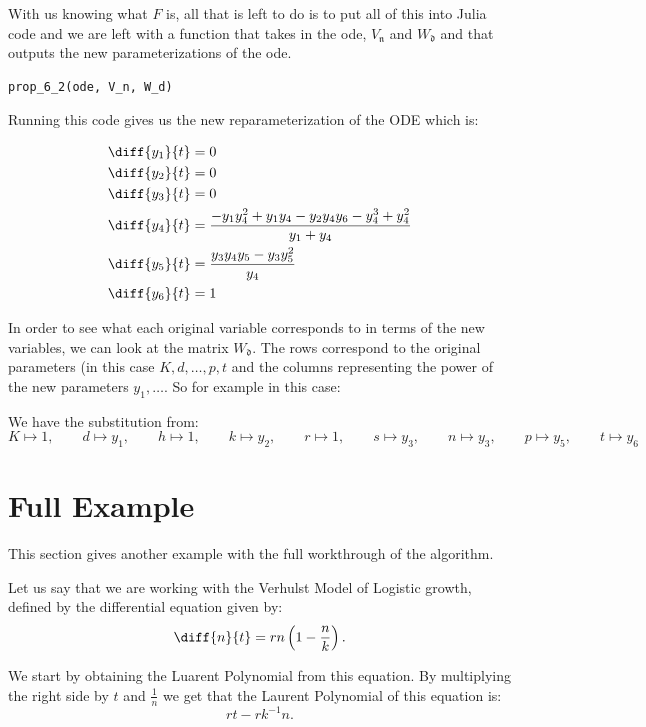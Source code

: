 \documentclass[oneside, a4paper, onecolumn, 11pt]{article}
\begin{document}
With us knowing what \(F\) is, all that is left to do is to put all of this into Julia code and we are left with a function that takes in the ode, \(V_{\mathfrak{n}}\) and \(W_{\mathfrak{d}}\) and that outputs the new parameterizations of the ode.
\begin{lstlisting}
prop_6_2(ode, V_n, W_d)
\end{lstlisting}

Running this code gives us the new reparameterization of the ODE which is:

\begin{align*}
    \diff{y_1}{t} & = 0                                                                    \\
    \diff{y_2}{t} & = 0                                                                    \\
    \diff{y_3}{t} & = 0                                                                    \\
    \diff{y_4}{t} & = \frac{-y_1 y_4^2 + y_1 y_4 - y_2 y_4 y_6 - y_4^3 + y_4^2}{y_1 + y_4} \\
    \diff{y_5}{t} & = \frac{y_3 y_4 y_5 - y_3 y_5^2}{y_4}                                  \\
    \diff{y_6}{t} & = 1
\end{align*}

In order to see what each original variable corresponds to in terms of the new variables, we can look at the matrix \(W_{\mathfrak{d}}\). The rows correspond to the original parameters (in this case \(K, d, \dots, p, t\) and the columns representing the power of the new parameters \(y_1, \dots\). So for example in this case:

We have the substitution from:
\[
    K \mapsto 1, \qquad d \mapsto y_1, \qquad h \mapsto 1, \qquad k \mapsto y_2, \qquad r \mapsto 1, \qquad s \mapsto y_3, \qquad n \mapsto y_3, \qquad p \mapsto y_5, \qquad t \mapsto y_6
\]

\section{Full Example}

This section gives another example with the full workthrough of the algorithm.

Let us say that we are working with the Verhulst Model of Logistic growth, defined by the differential equation given by:
\[
    \diff{n}{t} = rn \left( 1 - \frac{n}{k} \right).
\]

We start by obtaining the Luarent Polynomial from this equation. By multiplying the right side by \(t\) and \(\frac{1}{n}\) we get that the Laurent Polynomial of this equation is:
\[
    r t - r k^{-1} n.
\]
\end{document}
